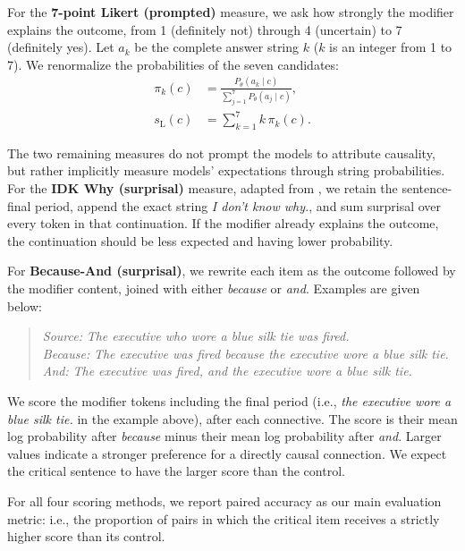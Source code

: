 \documentclass[11pt]{article}
\begin{document}
For the \textbf{7-point Likert (prompted)} measure, we ask how strongly the modifier explains the outcome, from 1 (definitely not) through 4 (uncertain) to 7 (definitely yes). Let $a_k$ be the complete answer string $ k$ ($k$ is an integer from 1 to 7). We renormalize the probabilities of the seven candidates:
\begin{equation}
\begin{aligned}
\pi_k(c)&=\frac{P_\theta(a_k\mid c)}
{\sum_{j=1}^{7}P_\theta(a_j\mid c)},\\
s_{\mathrm{L}}(c)&=\sum_{k=1}^{7}k\,\pi_k(c).
\end{aligned}
\label{eq:likert-main}
\end{equation}

The two remaining measures do not prompt the models to attribute causality, but rather implicitly measure models' expectations through string probabilities. For the \textbf{IDK Why (surprisal)} measure, adapted from \citet{pan-kehler-2025-pragmatic}, we retain the sentence-final period, append the exact string \emph{ I don't know why.}, and sum surprisal over every token in that continuation. If the modifier already explains the outcome, the continuation should be less expected and having lower probability.

For \textbf{Because-And (surprisal)}, we rewrite each item as the outcome followed by the modifier content, joined with either \emph{because} or \emph{and}. Examples are given below:
\begin{quote}
\textit{Source:} \emph{The executive who wore a blue silk tie was fired.}\\
\textit{Because:} \emph{The executive was fired because the executive wore a blue silk tie.}\\
\textit{And:} \emph{The executive was fired, and the executive wore a blue silk tie.}
\end{quote}
We score the modifier tokens including the final period (i.e., \emph{the executive wore a blue silk tie.} in the example above), after each connective. The score is their mean log probability after \emph{because} minus their mean log probability after \emph{and}. Larger values indicate a stronger preference for a directly causal connection. We expect the critical sentence to have the larger score than the control.

For all four scoring methods, we report paired accuracy as our main evaluation metric: i.e., the proportion of pairs in which the critical item receives a strictly higher score than its control. 
\end{document}
